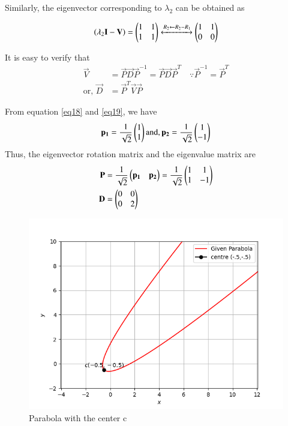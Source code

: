\documentclass[journal,12pt,twocolumn]{IEEEtran}
\begin{document}
  Similarly, the eigenvector corresponding to $\lambda_2$ can be obtained as
  
  \begin{align}
  \left(\lambda_2\mathbf{I}-\mathbf{V}\right)
  = \begin{pmatrix} 1 & 1 \\ 1 & 1\end{pmatrix} 
  \xleftrightarrow{R_2\leftarrow R_2 - R_1}
  \begin{pmatrix}
  	1 & 1   \\ 0 & 0 
  \end{pmatrix}
  \label{eq19}
  \end{align}
  
  
  

It is easy to verify that 
\begin{align}
\vec{V} &= \vec{P}\vec{D}\vec{P}^{-1}=\vec{P}\vec{D}\vec{P}^T \quad \because \vec{P}^{-1} = \vec{P}^{T} \label{eq:solutions/41/ex1/ellipse_spectrum_eq}
\\
\text{or, } \vec{D} &= \vec{P}^T\vec{V}\vec{P}
\end{align}


From equation \eqref{eq18} and \eqref{eq19}, we have
\begin{align}
\mathbf{p_1} =  \frac{1}{\sqrt{2}} \begin{pmatrix}1 \\ 1\end{pmatrix} 
\text{and},  \mathbf{p_2} =  \frac{1}{\sqrt{2}} \begin{pmatrix}1 \\ -1\end{pmatrix} 
\end{align}
Thus, the eigenvector rotation matrix and the
eigenvalue matrix are 
\begin{align}
\mathbf{P} &= \frac{1}{\sqrt{2}} \begin{pmatrix} \mathbf{p_1} & \mathbf{p_2}\end{pmatrix} = \frac{1}{\sqrt{2}} \begin{pmatrix} 1 & 1 \\ 1 & -1\end{pmatrix} \\
 \mathbf{D} &= \begin{pmatrix}0 & 0 \\ 0 & 2\end{pmatrix} 
\end{align}

\begin{figure}[htb!]	
	\centering	
	\includegraphics[width=\columnwidth]{parabola.png}	
	\caption{Parabola with the center c}
	\label{fig1}	
\end{figure}
\end{document}
